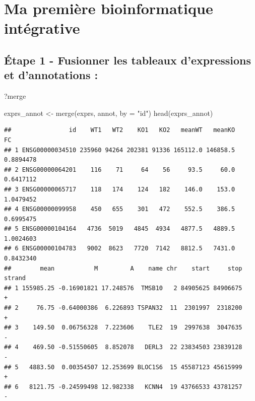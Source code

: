 \documentclass[
]{book}
\newenvironment{Shaded}{\begin{snugshade}}{\end{snugshade}}
\newcommand{\AttributeTok}[1]{\textcolor[rgb]{0.77,0.63,0.00}{#1}}
\newcommand{\FunctionTok}[1]{\textcolor[rgb]{0.00,0.00,0.00}{#1}}
\newcommand{\NormalTok}[1]{#1}
\newcommand{\OtherTok}[1]{\textcolor[rgb]{0.56,0.35,0.01}{#1}}
\newcommand{\StringTok}[1]{\textcolor[rgb]{0.31,0.60,0.02}{#1}}
\begin{document}
\hypertarget{ma-premiuxe8re-bioinformatique-intuxe9grative}{%
\section{Ma première bioinformatique intégrative}\label{ma-premiuxe8re-bioinformatique-intuxe9grative}}

\hypertarget{uxe9tape-1---fusionner-les-tableaux-dexpressions-et-dannotations}{%
\subsection{Étape 1 - Fusionner les tableaux d'expressions et d'annotations :}\label{uxe9tape-1---fusionner-les-tableaux-dexpressions-et-dannotations}}

\begin{Shaded}
\begin{Highlighting}[]
\NormalTok{?merge}
\end{Highlighting}
\end{Shaded}

\begin{Shaded}
\begin{Highlighting}[]
\NormalTok{exprs\_annot }\OtherTok{\textless{}{-}} \FunctionTok{merge}\NormalTok{(exprs, annot, }\AttributeTok{by =} \StringTok{"id"}\NormalTok{)}
\FunctionTok{head}\NormalTok{(exprs\_annot)}
\end{Highlighting}
\end{Shaded}

\begin{verbatim}
##                id    WT1   WT2    KO1   KO2   meanWT   meanKO        FC
## 1 ENSG00000034510 235960 94264 202381 91336 165112.0 146858.5 0.8894478
## 2 ENSG00000064201    116    71     64    56     93.5     60.0 0.6417112
## 3 ENSG00000065717    118   174    124   182    146.0    153.0 1.0479452
## 4 ENSG00000099958    450   655    301   472    552.5    386.5 0.6995475
## 5 ENSG00000104164   4736  5019   4845  4934   4877.5   4889.5 1.0024603
## 6 ENSG00000104783   9002  8623   7720  7142   8812.5   7431.0 0.8432340
##        mean           M         A    name chr    start     stop strand
## 1 155985.25 -0.16901821 17.248576  TMSB10   2 84905625 84906675      +
## 2     76.75 -0.64000386  6.226893 TSPAN32  11  2301997  2318200      +
## 3    149.50  0.06756328  7.223606    TLE2  19  2997638  3047635      -
## 4    469.50 -0.51550605  8.852078   DERL3  22 23834503 23839128      -
## 5   4883.50  0.00354507 12.253699 BLOC1S6  15 45587123 45615999      +
## 6   8121.75 -0.24599498 12.982338   KCNN4  19 43766533 43781257      -
\end{verbatim}
\end{document}
